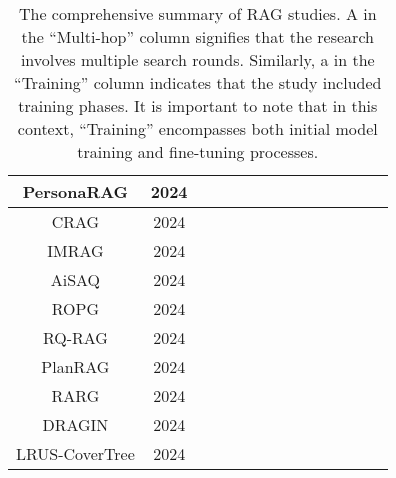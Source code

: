 \begin{table}[htb]
{\begin{tabular}{|c|c|c|c|c|c|c|c|c|c|c|c|c|c|}
			\hline
			PersonaRAG \cite{zerhoudi2024personarag} & 2024 & \Checkmark & \Checkmark & \Checkmark & \Checkmark & & \Checkmark & & \Checkmark & \Checkmark & & \Checkmark & \Checkmark \\
			\hline
			CRAG \cite{yan2024corrective} & 2024 & \Checkmark & \Checkmark & & \Checkmark & & & \Checkmark & & \Checkmark & \Checkmark & \Checkmark & \\
			\hline
			IMRAG \cite{yang2024imrag} & 2024 & & \Checkmark & \Checkmark & \Checkmark & & \Checkmark & & & \Checkmark & & \Checkmark & \\
			\hline
			AiSAQ \cite{tatsuno2024aisaq} & 2024 & \Checkmark & & & & \Checkmark & & & \Checkmark & \Checkmark & & & \\
			\hline
			ROPG \cite{salemi2024optimization} & 2024 & \Checkmark & & & \Checkmark & & & & \Checkmark & & & \Checkmark & \Checkmark \\
			\hline
			RQ-RAG \cite{chan2024rqrag} & 2024 & & \Checkmark & \Checkmark & \Checkmark & & \Checkmark & & & \Checkmark & & & \\
			\hline
			PlanRAG \cite{lee2024planrag} & 2024 & & \Checkmark & \Checkmark & & & \Checkmark & & & \Checkmark & & \Checkmark & \\
			\hline
			RARG \cite{yue2024evidencedriven} & 2024 & & \Checkmark & & \Checkmark & & & \Checkmark & \Checkmark & & & \Checkmark & \\
			\hline 
			DRAGIN \cite{su2024dragin} & 2024 & & \Checkmark & \Checkmark & & & \Checkmark & & \Checkmark & & & \Checkmark & \\
			\hline
			LRUS-CoverTree \cite{ma2024reconsidering} & 2024 & \Checkmark & & & \Checkmark & \Checkmark & & & \Checkmark & \Checkmark & & & \\
			\hline
		\end{tabular}
	}
	\caption{The comprehensive summary of RAG studies. A \Checkmark in the ``Multi-hop'' column signifies that the research involves multiple search rounds. Similarly, a \Checkmark in the ``Training'' column indicates that the study included training phases. It is important to note that in this context, ``Training'' encompasses both initial model training and fine-tuning processes.}
	\label{tab:appendixb}
\end{table}